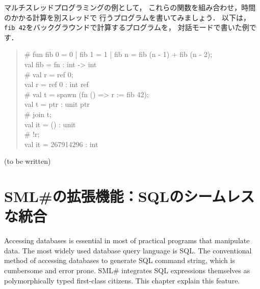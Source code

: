 \documentclass{jbook}
\newif\ifjp
\newcommand{\txt}[2]{#1}
\newcommand{\smlsharp}{SML\#}
\newenvironment{program}{\begin{quote}\begin{tt}}%
                        {\end{tt}\end{quote}}
\begin{document}
	マルチスレッドプログラミングの例として，
これらの関数を組み合わせ，時間のかかる計算を別スレッドで
行うプログラムを書いてみましょう．
	以下は，{\tt fib 42}をバックグラウンドで計算するプログラムを，
対話モードで書いた例です．
\begin{program}
\# fun fib 0 = 0 | fib 1 = 1 | fib n = fib (n - 1) + fib (n - 2);\\
val fib = fn : int -> int\\
\# val r = ref 0;\\
val r = ref 0 : int ref\\
\# val t = spawn (fn () => r := fib 42);\\
val t = ptr : unit ptr\\
\# join t;\\
val it = () : unit\\
\# !r;\\
val it = 267914296 : int
\end{program}

\else%
(to be written)
\fi%

\chapter{
\txt{\smlsharp{}の拡張機能：SQLのシームレスな統合}
{\smlsharp{} feature: seamless SQL integration}
}
\label{chap:tutorialDatabase}

\ifjp%
	データを扱う実用的なプログラムを書くためには，データベースシステ
ムとの連携が必要です．
	現在もっとも普及しているデータベースシステムは，問い合わせ言語
SQLを用いて操作します．
	種々のプログラミング言語で，データベース操作のためのマクロや関数
が提供されていますが，データベースを使いこなす本格的なプログラムを書くた
めには，SQL言語そのものを使いデータベースシステムを呼び出すコードを各必
要があります． 
	これまでの方法は，SQL文字列を生成するコードを書き，サーバに送る
ことでしたが，\smlsharp{}では，SQLそのものを型を持つ（したがって第一級の）
式として書くことができます．
	本節では，その利用方法を学びます．
\else%
	Accessing databases is essential in most of practical programs
that manipulate data.
	The most widely used database query language is SQL.
	The conventional method of accessing databases to generate SQL
command string, which is cumbersome and error prone.
	\smlsharp{} integrates SQL expressions themselves as
polymorphically typed first-class citizens.
	This chapter explain this feature.
\fi%
	
\end{document}
